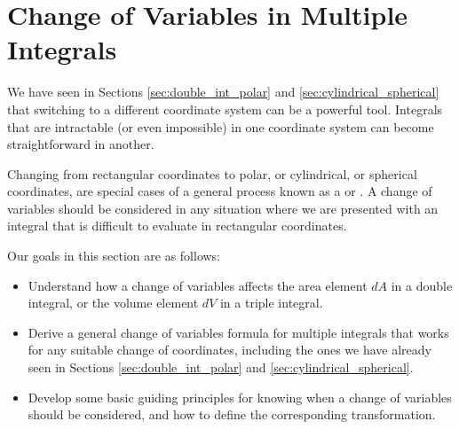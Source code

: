 \section{Change of Variables in Multiple Integrals}\label{sec:transformations}
We have seen in Sections \ref{sec:double_int_polar} and \ref{sec:cylindrical_spherical} that switching to a different coordinate system can be a powerful tool. Integrals that are intractable (or even impossible) in one coordinate system can become straightforward in another. 

Changing from rectangular coordinates to  polar, or cylindrical, or spherical coordinates, are special cases of a general process known as a   or . A change of variables should be considered in any situation where we are presented with an integral that is difficult to evaluate in rectangular coordinates.

Our goals in this section are as follows:
\begin{itemize}
\item Understand how a change of variables affects the area element $dA$ in a double integral, or the volume element $dV$ in a triple integral.
\item Derive a general change of variables formula for multiple integrals that works for any suitable change of coordinates, including the ones we have already seen in Sections \ref{sec:double_int_polar} and \ref{sec:cylindrical_spherical}.
\item Develop some basic guiding principles for knowing when a change of variables should be considered, and how to define the corresponding transformation. 
\end{itemize}

